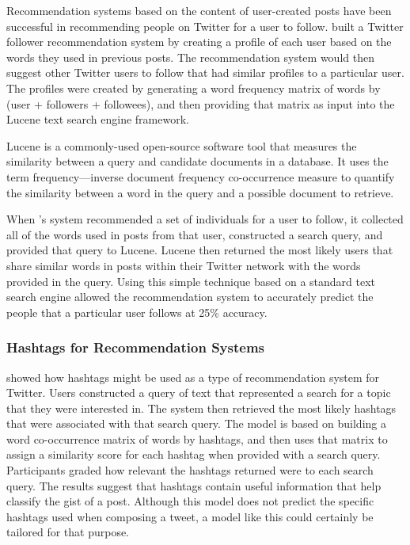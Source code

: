 \documentclass[man,floatsintext,donotrepeattitle]{apa6}
\begin{document}
Recommendation systems based on the content of user-created posts have been successful in recommending people on Twitter for a user to follow.
\textcite{Hannon2010} built a Twitter follower recommendation system by creating a profile of each user based on the words they used in previous posts.
The recommendation system would then suggest other Twitter users to follow that had similar profiles to a particular user.
The profiles were created by generating a word frequency matrix of words by (user + followers + followees), and then providing that matrix as input into the Lucene text search engine framework.

Lucene \parencite{McCandless2010} is a commonly-used open-source software tool that measures the similarity between a query and candidate documents in a database.
It uses the term frequency---inverse document frequency co-occurrence measure to quantify the similarity between a word in the query and a possible document to retrieve.

When \citeauthor{Hannon2010}'s system recommended a set of individuals for a user to follow, it collected all of the words used in posts from that user, constructed a search query, and provided that query to Lucene.
Lucene then returned the most likely users that share similar words in posts within their Twitter network with the words provided in the query.
Using this simple technique based on a standard text search engine allowed the recommendation system to accurately predict the people that a particular user follows at 25\% accuracy.

\subsubsection{Hashtags for Recommendation Systems}

\textcite{Efron2010} showed how hashtags might be used as a type of recommendation system for Twitter.
Users constructed a query of text that represented a search for a topic that they were interested in.
The system then retrieved the most likely hashtags that were associated with that search query.
The model is based on building a word co-occurrence matrix of words by hashtags, and then uses that matrix to assign a similarity score for each hashtag when provided with a search query.
Participants graded how relevant the hashtags returned were to each search query.
The results suggest that hashtags contain useful information that help classify the gist of a post. 
Although this model does not predict the specific hashtags used when composing a tweet, a model like this could certainly be tailored for that purpose.
\end{document}
